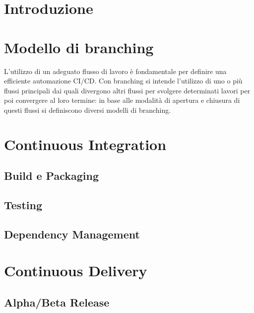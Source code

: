 
\section{Introduzione}

\section{Modello di branching}
L’utilizzo di un adeguato flusso di lavoro è fondamentale per definire una efficiente automazione CI/CD. Con branching si intende l’utilizzo di uno o più flussi principali dai quali divergono altri flussi per svolgere determinati lavori per poi convergere al loro termine: in base alle modalità di apertura e chiusura di questi flussi si definiscono diversi modelli di branching.

\section{Continuous Integration}
\subsection{Build e Packaging}

\subsection{Testing}

\subsection{Dependency Management}

\section{Continuous Delivery}

\subsection{Alpha/Beta Release}

